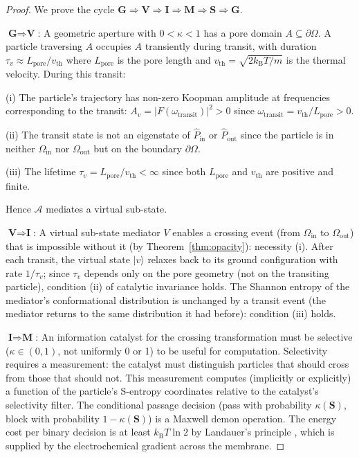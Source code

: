 \documentclass[11pt,twocolumn,a4paper]{article}
\theoremstyle{definition}
\theoremstyle{remark}
\newcommand{\kB}{k_{\mathrm{B}}}
\newcommand{\kap}{\kappa}
\newcommand{\Sent}{\bm{S}}
\begin{document}
\begin{proof}
We prove the cycle $\textbf{G} \Rightarrow \textbf{V} \Rightarrow \textbf{I}
\Rightarrow \textbf{M} \Rightarrow \textbf{S} \Rightarrow \textbf{G}$.

\vspace{4pt}
\noindent$\textbf{G} \Rightarrow \textbf{V}$: A geometric aperture with
$0 < \kap < 1$ has a pore domain $A \subseteq \partial\Omega$. A particle
traversing $A$ occupies $A$ transiently during transit, with duration
$\tau_v \approx L_{\mathrm{pore}} / v_{\mathrm{th}}$ where $L_{\mathrm{pore}}$
is the pore length and $v_{\mathrm{th}} = \sqrt{2\kB T / m}$ is the thermal
velocity. During this transit:

(i) The particle's trajectory has non-zero Koopman amplitude at frequencies
corresponding to the transit: $A_v = |F(\omega_{\mathrm{transit}})|^2 > 0$
since $\omega_{\mathrm{transit}} = v_{\mathrm{th}}/L_{\mathrm{pore}} > 0$.

(ii) The transit state is not an eigenstate of $\hat{P}_{\mathrm{in}}$ or
$\hat{P}_{\mathrm{out}}$ since the particle is in neither $\Omega_{\mathrm{in}}$
nor $\Omega_{\mathrm{out}}$ but on the boundary $\partial\Omega$.

(iii) The lifetime $\tau_v = L_{\mathrm{pore}}/v_{\mathrm{th}} < \infty$
since both $L_{\mathrm{pore}}$ and $v_{\mathrm{th}}$ are positive and finite.

Hence $\mathcal{A}$ mediates a virtual sub-state.

\vspace{4pt}
\noindent$\textbf{V} \Rightarrow \textbf{I}$: A virtual sub-state mediator $V$
enables a crossing event (from $\Omega_{\mathrm{in}}$ to $\Omega_{\mathrm{out}}$)
that is impossible without it (by Theorem~\ref{thm:opacity}): necessity (i).
After each transit, the virtual state $|v\rangle$ relaxes back to its ground
configuration with rate $1/\tau_v$; since $\tau_v$ depends only on the pore
geometry (not on the transiting particle), condition (ii) of catalytic invariance
holds. The Shannon entropy of the mediator's conformational distribution is
unchanged by a transit event (the mediator returns to the same distribution it
had before): condition (iii) holds.

\vspace{4pt}
\noindent$\textbf{I} \Rightarrow \textbf{M}$: An information catalyst for the
crossing transformation must be selective ($\kap \in (0,1)$, not uniformly
0 or 1) to be useful for computation. Selectivity requires a measurement: the
catalyst must distinguish particles that should cross from those that should
not. This measurement computes (implicitly or explicitly) a function of the
particle's S-entropy coordinates relative to the catalyst's selectivity filter.
The conditional passage decision (pass with probability $\kap(\Sent)$, block
with probability $1 - \kap(\Sent)$) is a Maxwell demon operation. The energy
cost per binary decision is at least $\kB T \ln 2$ by Landauer's principle
\citep{landauer1961}, which is supplied by the electrochemical gradient across
the membrane.


\end{proof}
\end{document}
